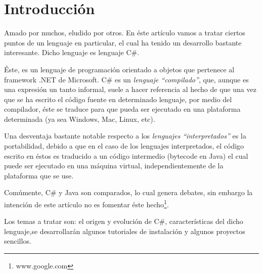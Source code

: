 \documentclass[../main.tex]{subfiles}
\begin{document}
\section{Introducción}
Amado por muchos, eludido por otros. En éste artículo vamos a tratar ciertos puntos de un lenguaje en particular, el cual ha tenido un desarrollo bastante interesante. Dicho lenguaje es lenguaje C\#.

Éste, es un lenguaje de programación orientado a objetos que pertenece al framework .NET de Microsoft.
C\# es un \textit{lenguaje “compilado''}, que, aunque es una expresión un tanto informal, suele a hacer referencia al hecho de que una vez que se ha escrito el código fuente en determinado lenguaje, por medio del compilador, éste se traduce para que pueda ser ejecutado en una plataforma determinada (ya sea Windows, Mac, Linux, etc). 

Una desventaja bastante notable respecto a los \textit{lenguajes “interpretados''} es la portabilidad, debido a que en el caso de los lenguajes interpretados, el código escrito en éstos es traducido a un código intermedio (bytecode en Java) el cual puede ser ejecutado en una máquina virtual, independientemente de la plataforma que se use. 

Comúmente, C\# y Java son comparados, lo cual genera debates, sin embargo la intención de este artículo no es fomentar éste hecho\footnote{www.google.com}.

Los temas a tratar son: el origen y evolución de C\#, características del dicho lenguaje,se desarrollarán algunos tutoriales de instalación y algunos proyectos sencillos.








\clearpage
\end{document}
